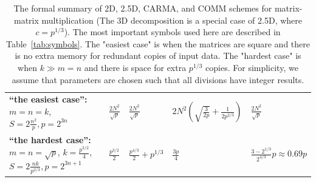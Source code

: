 \documentclass[sigplan,review,anonymous]{acmart}\settopmatter{printfolios=true,printccs=false,printacmref=false}
\begin{document}
\begin{table}
\begin{tabular}{lllll}
		\vspace{0.5em}
		\\
		\midrule
		\makecell[l]{\textbf{``the easiest case'':}\\
			$m = n = k$,\\
			$S = 2\frac{n^2}{p}, p=2^{3n}$}
		&
		$\frac{2N^2 }{\sqrt{p}}$
		&
		$\frac{2N^2 }{\sqrt{p}}$
		&
		$2N^2 \left(\sqrt{\frac{3}{2p}} + \frac{1}{2p^{2/3}} 
		\right)$
		& 
		$\frac{2N^2 }{\sqrt{p}}$
		\vspace{1.0em}
		\\
		\midrule
		\makecell[l]{\textbf{``the hardest case'':}\\
			$m = n = \sqrt{p}$,\\
			$k = \frac{p^{3/2}}{4}$,\\
			$S = 2\frac{nk}{p^{2/3}}, p=2^{3n + 1}$}
		&
		$\frac{p^{3/2}}{2}$
		&
		$\frac{p^{4/3}}{2} + p^{1/3}$
		&
		$\frac{3p}{4}$
		& 
		$\frac{3-2^{1/3}}{2^{4/3}}p \approx 0.69 p$
		\\
		\bottomrule
	\end{tabular}
	\caption{The formal summary of 2D,
		2.5D, CARMA, and COMM schemes for matrix-matrix 
		multiplication (The 3D 
		decomposition is a special case of 2.5D, where 
		$c=p^{1/3}$).
		The most important symbols used here are described in 
		Table~\ref{tab:symbols}.
		The "easiest case" is when the matrices are square 
		and there is no extra
		memory for redundant copies of input data. The 
		"hardest case" is when $k \gg m
		= n$ and there is space for extra $p^{1/3}$ copies.
		For simplicity, we assume that parameters are chosen 
		such that all divisions
		have integer results.}
	\label{tab:summary}
\end{table}
\end{document}
